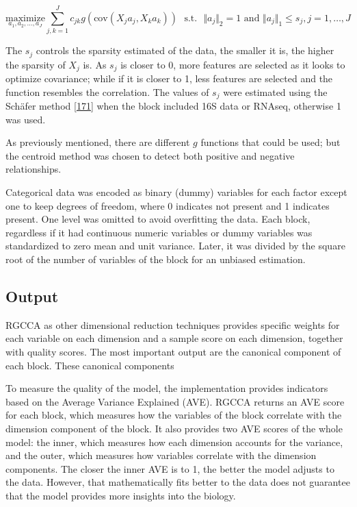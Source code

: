 \documentclass[
  a4paper,
]{book}
\begin{document}
\[
\underset{a_1,a_2, \dots,a_J}{\text{maximize}} \sum_{j, k = 1}^J c_{jk}g( \text{cov}(X_j a_j, X_k a_k)) \text{~~s.t.~~} \Vert a_j \Vert_2 = 1 \text{ and } \Vert a_j \Vert_1 \le s_j, j=1,\ldots,J
\]

The \(s_j\) controls the sparsity estimated of the data, the smaller it is, the higher the sparsity of \(X_j\) is.
As \(s_j\) is closer to 0, more features are selected as it looks to optimize covariance; while if it is closer to 1, less features are selected and the function resembles the correlation.
The values of \(s_j\) were estimated using the Schäfer method {[}\protect\hyperlink{ref-schuxe4fer2005}{171}{]} when the block included 16S data or RNAseq, otherwise 1 was used.

As previously mentioned, there are different \(g\) functions that could be used; but the centroid method was chosen to detect both positive and negative relationships.

Categorical data was encoded as binary (dummy) variables for each factor except one to keep degrees of freedom, where 0 indicates not present and 1 indicates present.
One level was omitted to avoid overfitting the data.
Each block, regardless if it had continuous numeric variables or dummy variables was standardized to zero mean and unit variance.
Later, it was divided by the square root of the number of variables of the block for an unbiased estimation.

\hypertarget{rgcca-output}{%
\subsection{Output}\label{rgcca-output}}

RGCCA as other dimensional reduction techniques provides specific weights for each variable on each dimension and a sample score on each dimension, together with quality scores.
The most important output are the canonical component of each block.
These canonical components

To measure the quality of the model, the implementation provides indicators based on the Average Variance Explained (AVE).
RGCCA returns an AVE score for each block, which measures how the variables of the block correlate with the dimension component of the block.
It also provides two AVE scores of the whole model: the inner, which measures how each dimension accounts for the variance, and the outer, which measures how variables correlate with the dimension components.
The closer the inner AVE is to 1, the better the model adjusts to the data.
However, that mathematically fits better to the data does not guarantee that the model provides more insights into the biology.
\end{document}
